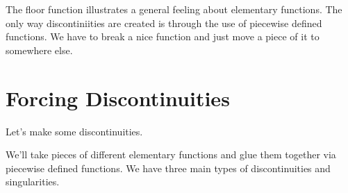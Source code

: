 \documentclass{ximera}
\begin{document}
The floor function illustrates a general feeling about elementary functions. The only way discontiniities are created is through the use of piecewise defined functions.  We have to break a nice function and just move a piece of it to somewhere else.











\section{Forcing Discontinuities}



Let's make some discontinuities.

We'll take pieces of different elementary functions and glue them together via piecewise defined functions. We have three main types of discontinuities and singularities.
\end{document}
